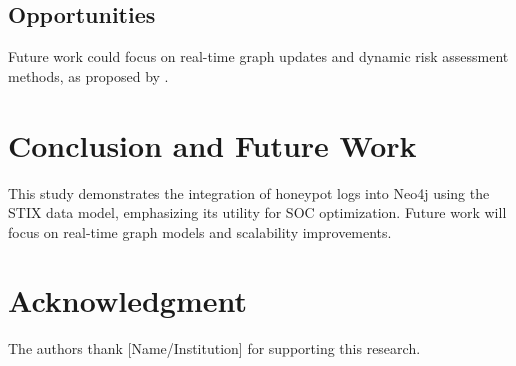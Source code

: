 \documentclass[conference]{IEEEtran}
\begin{document}
\subsection{Opportunities}
Future work could focus on real-time graph updates and dynamic risk assessment methods, as proposed by \cite{neo4jguide}.

\section{Conclusion and Future Work}
This study demonstrates the integration of honeypot logs into Neo4j using the STIX data model, emphasizing its utility for SOC optimization. Future work will focus on real-time graph models and scalability improvements.

\section*{Acknowledgment}
The authors thank [Name/Institution] for supporting this research.



\end{document}
